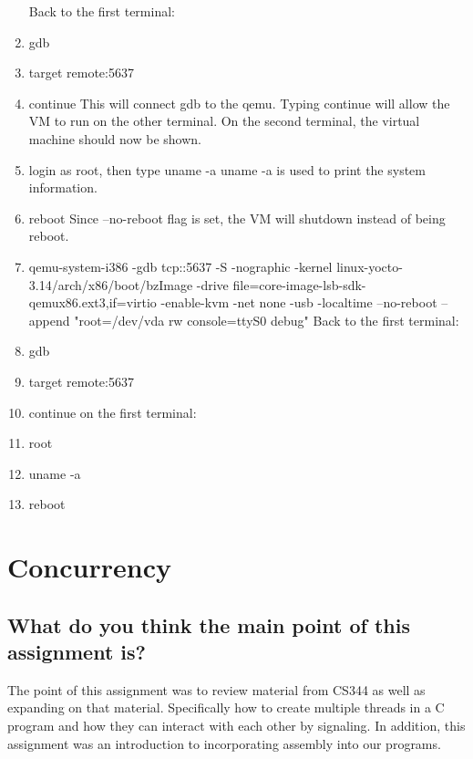 \documentclass[letterpaper,10pt,titlepage]{IEEEtran}
\begin{document}
\begin{enumerate}
    \newline
    Back to the first terminal:
    \item gdb
    \item target remote:5637
    \item continue
    \newline
    This will connect gdb to the qemu. Typing continue will allow the VM to run on the other terminal.
    \newline
    On the second terminal, the virtual machine should now be shown.
    \item login as root, then type uname -a
    \newline 
    uname -a is used to print the system information.
    \item reboot
    \newline
    Since --no-reboot flag is set, the VM will shutdown instead of being reboot.
    
    \item qemu-system-i386 -gdb tcp::5637 -S -nographic -kernel linux-yocto-3.14/arch/x86/boot/bzImage  -drive file=core-image-lsb-sdk-qemux86.ext3,if=virtio -enable-kvm -net none -usb -localtime --no-reboot --append "root=/dev/vda rw console=ttyS0 debug"
    \newline
    \newline
    Back to the first terminal:
    \item gdb
    \item target remote:5637
    \item continue
    \newline
    on the first terminal:
    \item root
    \item uname -a
    \item reboot
    
	\end{enumerate}
    
\section{Concurrency}
  \subsection{What do you think the main point of this assignment is?}
  The point of this assignment was to review material from CS344 as well as expanding on that material. Specifically how to create multiple threads in a C program and how they can interact with each other by signaling. In addition, this assignment was an introduction to incorporating assembly into our programs.
\end{document}
